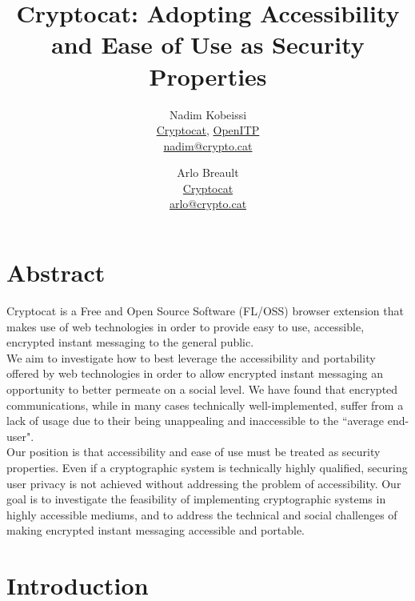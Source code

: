 \documentclass[letterpaper,twocolumn,10pt]{article}
\begin{document}
\thispagestyle{empty}
\date{}
\title{\Large \bf Cryptocat: Adopting Accessibility and Ease of Use as Security Properties}


\author{
{\rm Nadim Kobeissi}\\
\href{https://crypto.cat}{Cryptocat}, \href{http://openitp.org/}{OpenITP}\\
\href{mailto:nadim@crypto.cat}{nadim@crypto.cat}
\and
{\rm Arlo Breault}\\
\href{https://crypto.cat}{Cryptocat}\\
\href{mailto:arlo@crypto.cat}{arlo@crypto.cat}
}

\maketitle


\section*{Abstract}

Cryptocat is a Free and Open Source Software (FL/OSS) browser extension that makes use of web technologies in order to provide easy to use, accessible, encrypted instant messaging to the general public. \\
We aim to investigate how to best leverage the accessibility and portability offered by web technologies in order to allow encrypted instant messaging an opportunity to better permeate on a social level. We have found that encrypted communications, while in many cases technically well-implemented, suffer from a lack of usage due to their being unappealing and inaccessible to the ``average end-user". \\
Our position is that accessibility and ease of use must be treated as security properties. Even if a cryptographic system is technically highly qualified, securing user privacy is not achieved without addressing the problem of accessibility. Our goal is to investigate the feasibility of implementing cryptographic systems in highly accessible mediums, and to address the technical and social challenges of making encrypted instant messaging accessible and portable.

\section{Introduction}
\end{document}
